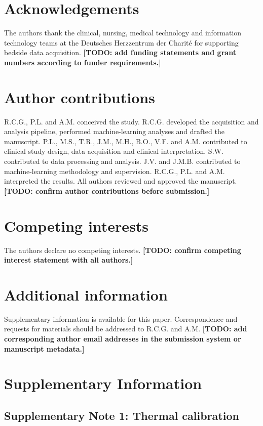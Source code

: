 \documentclass[pdflatex,sn-basic,Numbered]{sn-jnl}
\theoremstyle{thmstyleone}%
\theoremstyle{thmstyletwo}%
\theoremstyle{thmstylethree}%
\begin{document}
\section*{Acknowledgements}

The authors thank the clinical, nursing, medical technology and information technology teams at the Deutsches Herzzentrum der Charit\'{e} for supporting bedside data acquisition. \textbf{[TODO: add funding statements and grant numbers according to funder requirements.]}

\section*{Author contributions}

R.C.G., P.L. and A.M. conceived the study. R.C.G. developed the acquisition and analysis pipeline, performed machine-learning analyses and drafted the manuscript. P.L., M.S., T.R., J.M., M.H., B.O., V.F. and A.M. contributed to clinical study design, data acquisition and clinical interpretation. S.W. contributed to data processing and analysis. J.V. and J.M.B. contributed to machine-learning methodology and supervision. R.C.G., P.L. and A.M. interpreted the results. All authors reviewed and approved the manuscript. \textbf{[TODO: confirm author contributions before submission.]}

\section*{Competing interests}

The authors declare no competing interests. \textbf{[TODO: confirm competing interest statement with all authors.]}

\section*{Additional information}

Supplementary information is available for this paper. Correspondence and requests for materials should be addressed to R.C.G. and A.M. \textbf{[TODO: add corresponding author email addresses in the submission system or manuscript metadata.]}

\clearpage
\section*{Supplementary Information}

\subsection*{Supplementary Note 1: Thermal calibration}
\end{document}
